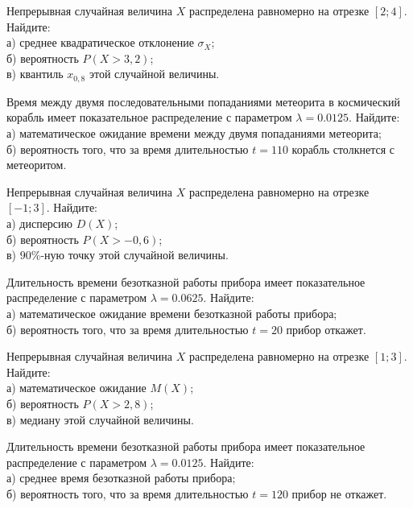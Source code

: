 \vfill

\newpage\setcounter{zad}{0}

\z Непрерывная случайная величина $X$ распределена равномерно на отрезке $[2; 4]$. Найдите: \\ \quad а) среднее квадратическое отклонение $\sigma_X$; \\ \quad б) вероятность $P(X>3{,}2)$; \\ \quad в) квантиль $x_{0{,}8}$ этой случайной величины.


\vfill

\z Время между двумя последовательными попаданиями метеорита в космический корабль имеет показательное распределение с параметром $\lambda = 0.0125$. Найдите: \\ \quad а) математическое ожидание времени между двумя попаданиями метеорита; \\ \quad б) вероятность того, что за время длительностью $t = 110$ корабль  столкнется с метеоритом.
 

\vfill

\newpage\setcounter{zad}{0}

\z Непрерывная случайная величина $X$ распределена равномерно на отрезке $[-1; 3]$. Найдите: \\ \quad а) дисперсию $D(X)$; \\ \quad б) вероятность $P(X>-0{,}6)$; \\ \quad в) $90\%$-ную точку этой случайной величины.


\vfill

\z Длительность времени безотказной работы прибора имеет показательное распределение с параметром $\lambda = 0.0625$. Найдите: \\ \quad а) математическое ожидание времени безотказной работы прибора; \\ \quad б) вероятность того, что за время длительностью $t = 20$ прибор  откажет.
 

\vfill

\newpage\setcounter{zad}{0}

\z Непрерывная случайная величина $X$ распределена равномерно на отрезке $[1; 3]$. Найдите: \\ \quad а) математическое ожидание $M(X)$; \\ \quad б) вероятность $P(X>2{,}8)$; \\ \quad в) медиану этой случайной величины.


\vfill

\z Длительность времени безотказной работы прибора имеет показательное распределение с параметром $\lambda = 0.0125$. Найдите: \\ \quad а) среднее время безотказной работы прибора; \\ \quad б) вероятность того, что за время длительностью $t = 120$ прибор не откажет.
 

